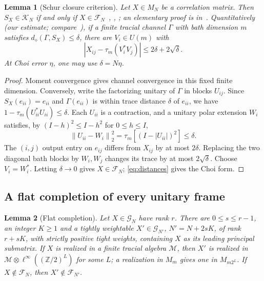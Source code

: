 \documentclass[11pt]{article}
\newtheorem{lemma}{Lemma}[section]
\theoremstyle{definition}
\theoremstyle{remark}
\newcommand{\K}{\mathcal K}
\newcommand{\G}{\mathcal G}
\newcommand{\Fm}{\mathcal F}
\newcommand{\norm}[1]{\left\lVert#1\right\rVert}
\begin{document}
\begin{lemma}[Schur closure criterion]\label{lem:schur}
Let $X\in M_N$ be a correlation matrix. Then $S_X\in\K_N$ if and only if $X\in\Fm_N$~\cite[Proposition~2.8 and proof of Theorem~6.2]{HM2011}, \cite[Theorem~3.6 and proof of Theorem~3.7]{HM2015}, \cite[Proposition~3.9(iii)]{Musat}; an elementary proof is in~\cite[Theorems~3.9 and~3.10]{HarrisEtAl}. Quantitatively (our estimate; compare~\cite[Theorem~3.9]{HarrisEtAl}), if a finite tracial channel $\Gamma$ with bath dimension $m$ satisfies $d_\diamond(\Gamma,S_X)\le\delta$, there are $V_i\in U(m)$ with
\[
 |X_{ij}-\tau_m(V_i^*V_j)|\le2\delta+2\sqrt\delta.
\]
At Choi error $\eta$, one may use $\delta=N\eta$.
\end{lemma}

\begin{proof}
Moment convergence gives channel convergence in this fixed finite dimension. Conversely, write the factorizing unitary of $\Gamma$ in blocks $U_{ij}$. Since $S_X(e_{ii})=e_{ii}$ and $\Gamma(e_{ii})$ is within trace distance $\delta$ of $e_{ii}$, we have $1-\tau_m(U_{ii}^*U_{ii})\le\delta$. Each $U_{ii}$ is a contraction, and a unitary polar extension $W_i$ satisfies, by $(I-h)^2\le I-h^2$ for $0\le h\le I$,
\[
 \norm{U_{ii}-W_i}_2^2
 =\tau_m[(I-|U_{ii}|)^2]\le\delta.
\]
The $(i,j)$ output entry on $e_{ij}$ differs from $X_{ij}$ by at most $2\delta$. Replacing the two diagonal bath blocks by $W_i,W_j$ changes its trace by at most $2\sqrt\delta$. Choose $V_i=W_i^*$. Letting $\delta\to0$ gives $X\in\Fm_N$; \eqref{eq:distances} gives the Choi form.
\end{proof}

\subsection{A flat completion of every unitary frame}

\begin{lemma}[Flat completion]\label{lem:completion}
Let $X\in\G_N$ have rank $r$. There are $0\le s\le r-1$, an integer $K\ge1$ and a tightly weightable $X'\in\G_{N'}$, $N'=N+2sK$, of rank $r+sK$, with strictly positive tight weights, containing $X$ as its leading principal submatrix. If $X$ is realized in a finite tracial algebra $\mathcal M$, then $X'$ is realized in $\mathcal M\otimes\ell^\infty((\mathbb Z/2)^L)$ for some $L$; a realization in $M_m$ gives one in $M_{m2^L}$. If $X\notin\Fm_N$, then $X'\notin\Fm_{N'}$.
\end{lemma}
\end{document}
